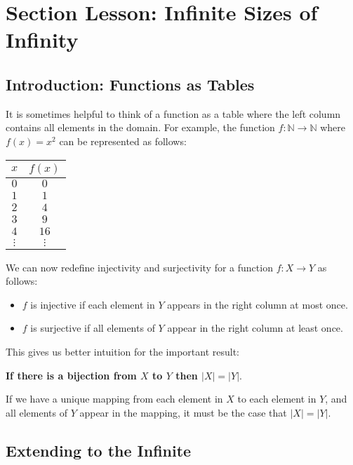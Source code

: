 \documentclass[12pt,letterpaper]{article}
\newcommand\N{\mathbb N}
\begin{document}
      \section*{Section Lesson: Infinite Sizes of Infinity}

      \subsection*{Introduction: Functions as Tables}

      It is sometimes helpful to think of a function as a table where the left column contains all elements in the domain. For example, the function $f: \N \rightarrow \N$ where $f(x) = x^2$ can be represented as follows:


      \begin{center}
      \begin{tabular}{c | c}
        $x$ & $f(x)$ \\
        \hline $0$ & $0$ \\
         $1$ & $1$ \\
         $2$ & $4$ \\
         $3$ & $9$ \\
         $4$ & $16$ \\
         $\vdots$ & $\vdots$ \\
      \end{tabular}
      \end{center}

      We can now redefine injectivity and surjectivity for a function $f: X \rightarrow Y$ as follows:
      \begin{itemize}
        \item $f$ is injective if each element in $Y$ appears in the right column at most once.
        \item $f$ is surjective if all elements of $Y$ appear in the right column at least once.
      \end{itemize}
      
      This gives us better intuition for the important result:

      \textbf{If there is a bijection from $X$ to $Y$ then $|X| = |Y|$}.

      If we have a unique mapping from each element in $X$ to each element in $Y$, and all elements of $Y$ appear in the mapping, it must be the case that $|X| = |Y|$. 

      \subsection*{Extending to the Infinite}
\end{document}

